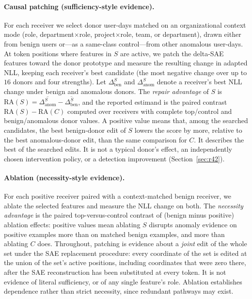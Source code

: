 \documentclass[10pt]{article} %
\begin{document}
\paragraph{Causal patching (sufficiency-style evidence).}
For each receiver we select donor user-days matched on an organizational
context mode (role, department$\times$role, project$\times$role, team, or
department), drawn either from benign users or---as a same-class control---from
other anomalous user-days. At token positions where features in $S$ are
active, we patch the delta-SAE features toward the donor prototype and measure
the resulting change in adapted NLL, keeping each receiver's best candidate
(the most negative change over up to $16$ donors and four strengths). Let
$\Delta^{S}_{\mathrm{ben}}$ and $\Delta^{S}_{\mathrm{anom}}$ denote a
receiver's best NLL change under benign and anomalous donors. The
\emph{repair advantage} of $S$ is
$\mathrm{RA}(S) = \overline{\Delta^{S}_{\mathrm{anom}}} -
\overline{\Delta^{S}_{\mathrm{ben}}}$,
and the reported estimand is the paired contrast
$\mathrm{RA}(S) - \mathrm{RA}(C)$ computed over receivers with complete
top/control and benign/anomalous donor values. A positive value means that,
among the searched candidates, the best benign-donor edit of $S$ lowers the
score by more, relative to the best anomalous-donor edit, than the same
comparison for $C$. It describes the best of the searched edits. It is not a
typical donor's effect, an independently chosen intervention policy, or a
detection improvement (Section~\ref{sec:r42}).

\paragraph{Ablation (necessity-style evidence).}
For each positive receiver paired with a context-matched benign receiver, we
ablate the selected features and measure the NLL change on both. The
\emph{necessity advantage} is the paired top-versus-control contrast of
(benign minus positive) ablation effects: positive values mean ablating $S$
disrupts anomaly evidence on positive examples more than on matched benign
examples, and more than ablating $C$ does. Throughout, patching is evidence
about a \emph{joint} edit of the whole set under the SAE replacement
procedure: every coordinate of the set is edited at the union of the set's
active positions, including coordinates that were zero there, after the SAE
reconstruction has been substituted at every token. It is not evidence of
literal sufficiency, or of any single feature's role. Ablation establishes
dependence rather than strict necessity, since redundant pathways may exist.
\end{document}
